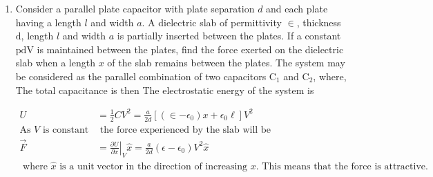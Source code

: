\begin{enumerate} [label=\color{ocre}\textbf{\arabic*.}]
	\begin{answer}
		(derive capacitance of two wire capacitors)
	\end{answer}
	\item Consider a parallel plate capacitor with plate separation $d$ and each plate having a length $l$ and width $a$. A dielectric slab of permittivity $\in$, thickness $\mathrm{d}$, length $l$ and width $a$ is partially inserted between the plates. If a constant $\mathrm{pd} \mathrm{V}$ is maintained between the plates, find the force exerted on the dielectric slab when a length $x$ of the slab remains between the plates.
	The system may be considered as the parallel combination of two capacitors $\mathrm{C}_{1}$ and $\mathrm{C}_{2}$, where, The total capacitance is then
	The electrostatic energy of the system is
	\begin{answer}
		\begin{align*}
		U&=\frac{1}{2} C V^{2}=\frac{a}{2 d}\left[\left(\in-\epsilon_{0}\right) x+\epsilon_{0} \ell\right] V^{2}\\
		\text{As $V$ is constant}&\text{ the force experienced by the slab will be}\\
		\vec{F}&=\left.\frac{\partial U}{\partial x}\right|_{V} \hat{x}=\frac{a}{2 d}\left(\epsilon-\epsilon_{0}\right) V^{2} \hat{x}\\
	\text{	where $\hat{x}$ is a unit }&\text{vector in the direction of increasing $x .$ This means that the force is attractive.}
		\end{align*}
	\end{answer}
	

\end{enumerate}
